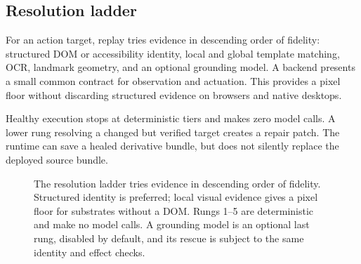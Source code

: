 \subsection{Resolution ladder}
For an action target, replay tries evidence in descending order of fidelity:
structured DOM or accessibility identity, local and global template matching,
OCR, landmark geometry, and an optional grounding model. A backend presents a
small common contract for observation and actuation. This provides a pixel
floor without discarding structured evidence on browsers and native desktops.

Healthy execution stops at deterministic tiers and makes zero model calls. A
lower rung resolving a changed but verified target creates a repair patch. The
runtime can save a healed derivative bundle, but does not silently replace the
deployed source bundle.

\begin{figure}[t]
\centering
{}
\caption{The resolution ladder tries evidence in descending order of fidelity.
Structured identity is preferred; local visual evidence gives a pixel floor for
substrates without a DOM. Rungs 1--5 are deterministic and make no model calls.
A grounding model is an optional last rung, disabled by default, and its rescue
is subject to the same identity and effect checks.}
\label{fig:ladder}
\end{figure}

